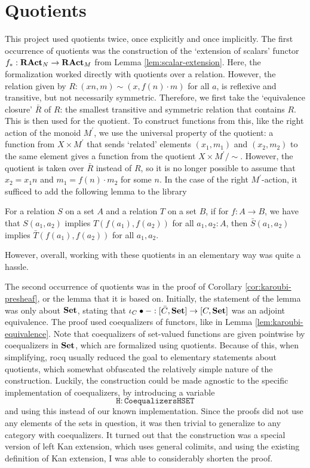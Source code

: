 \section{Quotients}\label{sec:quotients}
This project used quotients twice, once explicitly and once implicitly. The first occurrence of quotients was the construction of the `extension of scalars' functor $ f_*: \mathbf{RAct}_{N} \to \mathbf{RAct}_{M} $ from Lemma \ref{lem:scalar-extension}. Here, the formalization worked directly with quotients over a relation. However, the relation given by $ R : (x n, m) \sim (x, f(n) \cdot m) $ for all $ a $, is reflexive and transitive, but not necessarily symmetric. Therefore, we first take the `equivalence closure' $ \bar R $ of $ R $: the smallest transitive and symmetric relation that contains $ R $. This is then used for the quotient. To construct functions from this, like the right action of the monoid $ M^\prime $, we use the universal property of the quotient: a function from $ X \times M^\prime $ that sends `related' elements $ (x_1, m_1) $ and $ (x_2, m_2) $ to the same element gives a function from the quotient $ X \times M^\prime / \sim $. However, the quotient is taken over $ \bar R $ instead of $ R $, so it is no longer possible to assume that $ x_2 = x_1 n $ and $ m_1 = f(n) \cdot m_2 $ for some $ n $. In the case of the right $ M^\prime $-action, it sufficed to add the following lemma to the library
\begin{lemma}
  For a relation $ S $ on a set $ A $ and a relation $ T $ on a set $ B $, if for $ f: A \to B $, we have that $ S(a_1, a_2) $ implies $ T(f(a_1), f(a_2)) $ for all $ a_1, a_2 : A $, then $ \bar S(a_1, a_2) $ implies $ \bar T(f(a_1), f(a_2)) $ for all $ a_1, a_2 $.
\end{lemma}
However, overall, working with these quotients in an elementary way was quite a hassle.

The second occurrence of quotients was in the proof of Corollary \ref{cor:karoubi-presheaf}, or the lemma that it is based on. Initially, the statement of the lemma was only about $ \mathbf{Set} $, stating that $ \iota_C \bullet - : [\bar C, \mathbf{Set}] \to [C, \mathbf{Set}] $ was an adjoint equivalence. The proof used coequalizers of functors, like in Lemma \ref{lem:karoubi-equivalence}. Note that coequalizers of set-valued functions are given pointwise by coequalizers in $ \mathbf{Set} $, which are formalized using quotients. Because of this, when simplifying, rocq usually reduced the goal to elementary statements about quotients, which somewhat obfuscated the relatively simple nature of the construction. Luckily, the construction could be made agnostic to the specific implementation of coequalizers, by introducing a variable
\[ \mathtt{H : Coequalizers HSET} \]
and using this instead of our known implementation. Since the proofs did not use any elements of the sets in question, it was then trivial to generalize to any category with coequalizers. It turned out that the construction was a special version of left Kan extension, which uses general colimits, and using the existing definition of Kan extension, I was able to considerably shorten the proof.

